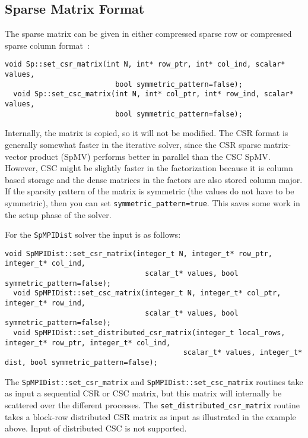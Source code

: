 \documentclass{article}
\begin{document}
\subsection{Sparse Matrix Format}
The sparse matrix can be given in either compressed sparse row or
compressed sparse column format~\cite{saad2003iterative}:
\begin{lstlisting}[style=C]
  void Sp::set_csr_matrix(int N, int* row_ptr, int* col_ind, scalar* values,
                          bool symmetric_pattern=false);
  void Sp::set_csc_matrix(int N, int* col_ptr, int* row_ind, scalar* values,
                          bool symmetric_pattern=false);
\end{lstlisting}
Internally, the matrix is copied, so it will not be modified.  The CSR
format is generally somewhat faster in the iterative solver, since the
CSR sparse matrix-vector product (SpMV) performs better in parallel
than the CSC SpMV. However, CSC might be slightly faster in the
factorization because it is column based storage and the dense
matrices in the factors are also stored column major. If the sparsity
pattern of the matrix is symmetric (the values do not have to be
symmetric), then you can set
\lstinline[style=C]!symmetric_pattern=true!. This saves some work in
the setup phase of the solver.

For the \lstinline[style=C]!SpMPIDist! solver the input is as follows:
\begin{lstlisting}[style=C]
  void SpMPIDist::set_csr_matrix(integer_t N, integer_t* row_ptr, integer_t* col_ind,
                                 scalar_t* values, bool symmetric_pattern=false);
  void SpMPIDist::set_csc_matrix(integer_t N, integer_t* col_ptr, integer_t* row_ind,
                                 scalar_t* values, bool symmetric_pattern=false);
  void SpMPIDist::set_distributed_csr_matrix(integer_t local_rows, integer_t* row_ptr, integer_t* col_ind,
                                          scalar_t* values, integer_t* dist, bool symmetric_pattern=false);
\end{lstlisting}
The \lstinline[style=C]!SpMPIDist::set_csr_matrix! and
\lstinline[style=C]!SpMPIDist::set_csc_matrix! routines take as input
a sequential CSR or CSC matrix, but this matrix will internally be
scattered over the different processes. The
\lstinline[style=C]!set_distributed_csr_matrix! routine
takes a block-row distributed CSR matrix as input as illustrated in
the example above. Input of distributed CSC is not supported.
\end{document}
